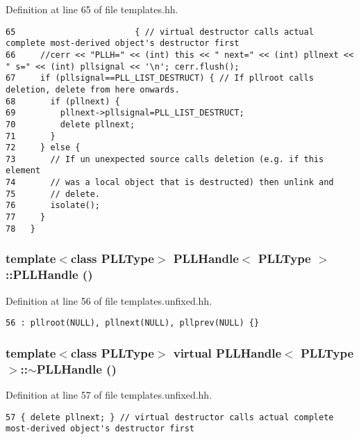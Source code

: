 Definition at line 65 of file templates.hh.



\footnotesize\begin{verbatim}65                        { // virtual destructor calls actual complete most-derived object's destructor first
66     //cerr << "PLLH=" << (int) this << " next=" << (int) pllnext << " s=" << (int) pllsignal << '\n'; cerr.flush();
67     if (pllsignal==PLL_LIST_DESTRUCT) { // If pllroot calls deletion, delete from here onwards.
68       if (pllnext) {
69         pllnext->pllsignal=PLL_LIST_DESTRUCT;
70         delete pllnext;
71       }
72     } else {
73       // If un unexpected source calls deletion (e.g. if this element
74       // was a local object that is destructed) then unlink and
75       // delete.
76       isolate();
77     }
78   }
\end{verbatim}\normalsize 
{}
\subsubsection{\setlength{\rightskip}{0pt plus 5cm}template$<$class PLLType$>$ PLLHandle$<$ {\bf PLLType} $>$::PLLHandle ()\hspace{0.3cm}{\tt  [inline, protected]}}\label{classPLLHandle_b7}




Definition at line 56 of file templates.unfixed.hh.



\footnotesize\begin{verbatim}56 : pllroot(NULL), pllnext(NULL), pllprev(NULL) {} 
\end{verbatim}\normalsize 
{}
\subsubsection{\setlength{\rightskip}{0pt plus 5cm}template$<$class PLLType$>$ virtual PLLHandle$<$ {\bf PLLType} $>$::$\sim$PLLHandle ()\hspace{0.3cm}{\tt  [inline, protected, virtual]}}\label{classPLLHandle_b8}




Definition at line 57 of file templates.unfixed.hh.



\footnotesize\begin{verbatim}57 { delete pllnext; } // virtual destructor calls actual complete most-derived object's destructor first
\end{verbatim}\normalsize 


